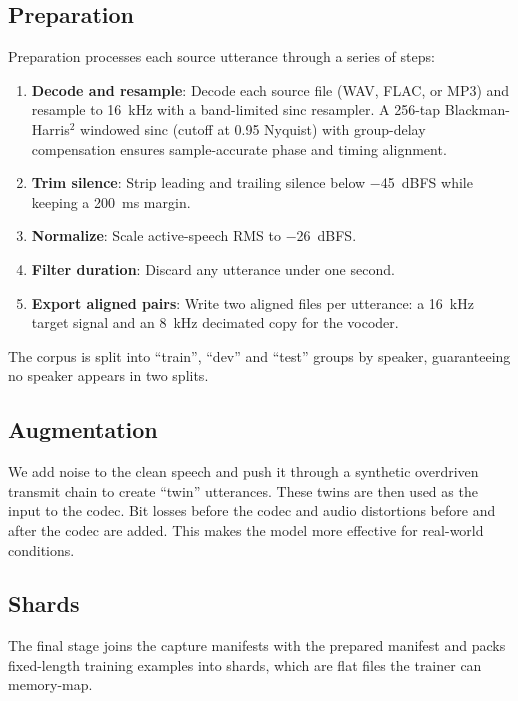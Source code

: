 \documentclass[10pt,twocolumn,a4paper]{article}
\begin{document}
\subsection{Preparation}

Preparation processes each source utterance through a series of steps:

\begin{enumerate}\itemsep2pt
  \item \textbf{Decode and resample}: Decode each source file (WAV,
    FLAC, or MP3) and resample to \SI{16}{kHz} with a band-limited
    sinc resampler. A 256-tap Blackman-Harris$^2$ windowed sinc
    (cutoff at 0.95 Nyquist) with group-delay compensation ensures
    sample-accurate phase and timing alignment.
  \item \textbf{Trim silence}: Strip leading and trailing silence
    below \SI{-45}{dBFS} while keeping a \SI{200}{ms} margin.
  \item \textbf{Normalize}: Scale active-speech RMS to \SI{-26}{dBFS}.
  \item \textbf{Filter duration}: Discard any utterance under one second.
  \item \textbf{Export aligned pairs}: Write two aligned files per
    utterance: a \SI{16}{kHz} target signal and an \SI{8}{kHz}
    decimated copy for the vocoder.
\end{enumerate}

The corpus is split into ``train'', ``dev'' and ``test'' groups by
speaker, guaranteeing no speaker appears in two splits.

\subsection{Augmentation}

We add noise to the clean speech and push it through a synthetic
overdriven transmit chain to create ``twin'' utterances.  These 
twins are then used as the input to the codec.  Bit losses before
the codec and audio distortions before and after the codec
are added.  This makes the model more effective for real-world
conditions.

\subsection{Shards}
\label{sec:shards}

The final stage joins the capture manifests with the prepared manifest
and packs fixed-length training examples into shards, which are flat
files the trainer can memory-map.
\end{document}
